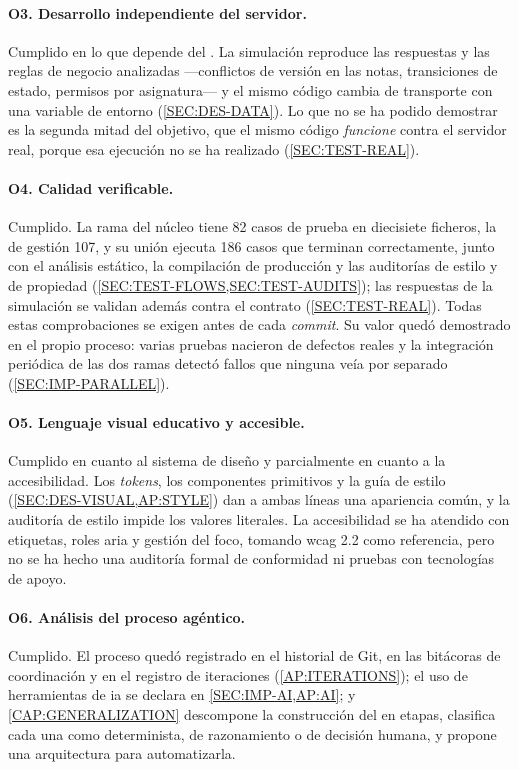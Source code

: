 \paragraph{O3. Desarrollo independiente del servidor.} Cumplido en lo que depende del
. La simulación reproduce las respuestas y las reglas de negocio analizadas
---conflictos de versión en las notas, transiciones de estado, permisos por asignatura---
y el mismo código cambia de transporte con una variable de entorno (\cref{SEC:DES-DATA}).
Lo que no se ha podido demostrar es la segunda mitad del objetivo, que el mismo código
\emph{funcione} contra el servidor real, porque esa ejecución no se ha realizado
(\cref{SEC:TEST-REAL}).

\paragraph{O4. Calidad verificable.} Cumplido. La rama del núcleo tiene 82 casos de prueba
en diecisiete ficheros, la de gestión 107, y su unión ejecuta 186 casos que terminan
correctamente, junto con el análisis estático, la compilación de producción y las
auditorías de estilo y de propiedad (\cref{SEC:TEST-FLOWS,SEC:TEST-AUDITS}); las respuestas
de la simulación se validan además contra el contrato (\cref{SEC:TEST-REAL}). Todas estas
comprobaciones se exigen antes de cada \textit{commit}. Su valor quedó demostrado en el
propio proceso: varias pruebas nacieron de defectos reales y la integración periódica de las
dos ramas detectó fallos que ninguna veía por separado (\cref{SEC:IMP-PARALLEL}).

\paragraph{O5. Lenguaje visual educativo y accesible.} Cumplido en cuanto al sistema de
diseño y parcialmente en cuanto a la accesibilidad. Los \textit{tokens}, los componentes
primitivos y la guía de estilo (\cref{SEC:DES-VISUAL,AP:STYLE}) dan a ambas líneas una
apariencia común, y la auditoría de estilo impide los valores literales. La accesibilidad
se ha atendido con etiquetas, roles \acs{aria} y gestión del foco, tomando \acs{wcag} 2.2 como referencia, pero no se ha hecho una auditoría
formal de conformidad ni pruebas con tecnologías de apoyo.

\paragraph{O6. Análisis del proceso agéntico.} Cumplido. El proceso quedó registrado en el
historial de Git, en las bitácoras de coordinación y en el registro de iteraciones
(\cref{AP:ITERATIONS}); el uso de herramientas de \acs{ia} se declara en
\cref{SEC:IMP-AI,AP:AI}; y \cref{CAP:GENERALIZATION} descompone la construcción del
 en etapas, clasifica cada una como determinista, de razonamiento o de
decisión humana, y propone una arquitectura para automatizarla.

